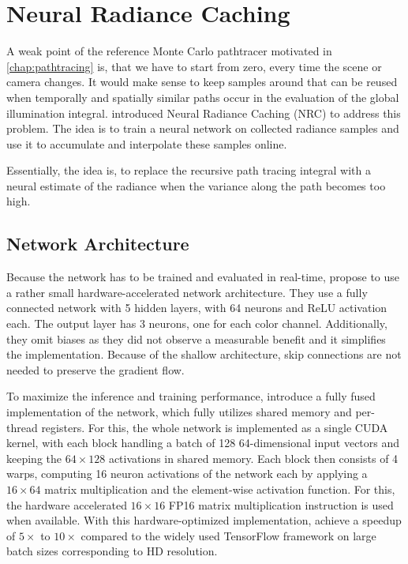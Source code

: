 
\chapter{Neural Radiance Caching}
\label{chap:nrc}

A weak point of the reference Monte Carlo pathtracer motivated in \ref{chap:pathtracing} is, that we have to start from zero, every time the scene or camera changes.
It would make sense to keep samples around that can be reused when temporally and spatially similar paths occur in the evaluation of the global illumination integral.
\textcite{muller2021} introduced Neural Radiance Caching (NRC) to address this problem.
The idea is to train a neural network on collected radiance samples and use it to accumulate and interpolate these samples online.

Essentially, the idea is, to replace the recursive path tracing integral with a neural estimate of the radiance when the variance along the path becomes too high.

\section{Network Architecture}

Because the network has to be trained and evaluated in real-time, \textcite{muller2021} propose to use a rather small hardware-accelerated network architecture.
They use a fully connected network with 5 hidden layers, with 64 neurons and ReLU activation each.
The output layer has 3 neurons, one for each color channel.
Additionally, they omit biases as they did not observe a measurable benefit and it simplifies the implementation.
Because of the shallow architecture, skip connections are not needed to preserve the gradient flow.

To maximize the inference and training performance, \textcite{muller2021} introduce a fully fused implementation of the network, which fully utilizes shared memory and per-thread registers.
For this, the whole network is implemented as a single CUDA kernel, with each block handling a batch of 128 64-dimensional input vectors and keeping the $64\times128$ activations in shared memory.
Each block then consists of 4 warps, computing 16 neuron activations of the network each by applying a $16\times64$ matrix multiplication and the element-wise activation function.
For this, the hardware accelerated $16\times16$ FP16 matrix multiplication instruction is used when available.
With this hardware-optimized implementation, \textcite{muller2021} achieve a speedup of $5\times$ to $10\times$ compared to the widely used TensorFlow framework  on large batch sizes corresponding to HD resolution.


